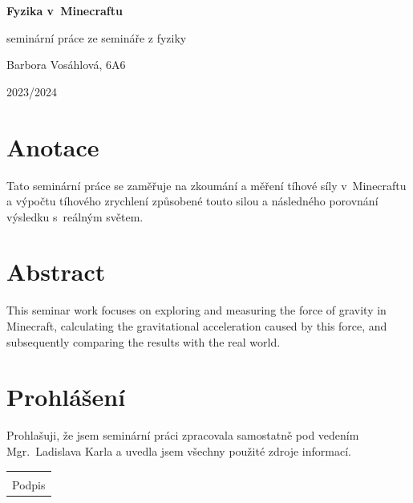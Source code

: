 \documentclass[a4paper, twoside]{article}
\begin{document}
\begin{titlepage}
    \thispagestyle{bezCislovani}
    \begin{flushleft}
        \vspace*{5cm}
        {\Huge \textbf{Fyzika v~Minecraftu} \par}
        {\Large seminární práce ze semináře z fyziky \par}
        \vspace{12cm}
        {\normalsize Barbora Vosáhlová, 6A6 \par}
        {\normalsize 2023/2024 \par}
    \end{flushleft}
\end{titlepage}

\newpage
\thispagestyle{empty}
\mbox{}
\newpage

\newpage
\setcounter{page}{1}
\thispagestyle{empty}
\section*{Anotace}
Tato seminární práce se zaměřuje na zkoumání a měření tíhové síly v~Minecraftu a výpočtu tíhového zrychlení způsobené touto silou a následného porovnání výsledku s~reálným světem.

\section*{Abstract}
This seminar work focuses on exploring and measuring the force of gravity in Minecraft, calculating the gravitational acceleration caused by this force, and subsequently comparing the results with the real world.

\newpage
\thispagestyle{empty}
\mbox{}
\newpage

\newpage
\thispagestyle{empty}
\vspace*{\fill} 
\section*{Prohlášení}
Prohlašuji, že jsem seminární práci zpracovala samostatně pod vedením Mgr.~Ladislava Karla a uvedla jsem všechny použité zdroje informací.
\vspace{2cm}

\begin{flushright}
\begin{tabular}{@{}p{5cm}@{}}
\hline
\\
\centering Podpis \\
\end{tabular}
\end{flushright}
\end{document}
